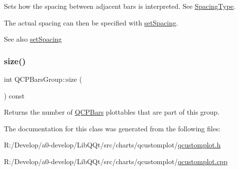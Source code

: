 Sets how the spacing between adjacent bars is interpreted. See \mbox{\hyperlink{class_q_c_p_bars_group_a4c0521120a97e60bbca37677a37075b6}{Spacing\+Type}}.

The actual spacing can then be specified with \mbox{\hyperlink{class_q_c_p_bars_group_aa553d327479d72a0c3dafcc724a190e2}{set\+Spacing}}.

\begin{DoxySeeAlso}{See also}
\mbox{\hyperlink{class_q_c_p_bars_group_aa553d327479d72a0c3dafcc724a190e2}{set\+Spacing}} 
\end{DoxySeeAlso}
\mbox{\label{class_q_c_p_bars_group_a3780ec77919cb00840207ec7a0f00dd5}} 
\subsubsection{\texorpdfstring{size()}{size()}}
{\footnotesize\ttfamily int Q\+C\+P\+Bars\+Group\+::size (\begin{DoxyParamCaption}{ }\end{DoxyParamCaption}) const\hspace{0.3cm}{\ttfamily [inline]}}

Returns the number of \mbox{\hyperlink{class_q_c_p_bars}{Q\+C\+P\+Bars}} plottables that are part of this group. 

The documentation for this class was generated from the following files\+:\begin{DoxyCompactItemize}
\item 
R\+:/\+Develop/a0-\/develop/\+Lib\+Q\+Qt/src/charts/qcustomplot/\mbox{\hyperlink{qcustomplot_8h}{qcustomplot.\+h}}\item 
R\+:/\+Develop/a0-\/develop/\+Lib\+Q\+Qt/src/charts/qcustomplot/\mbox{\hyperlink{qcustomplot_8cpp}{qcustomplot.\+cpp}}\end{DoxyCompactItemize}
